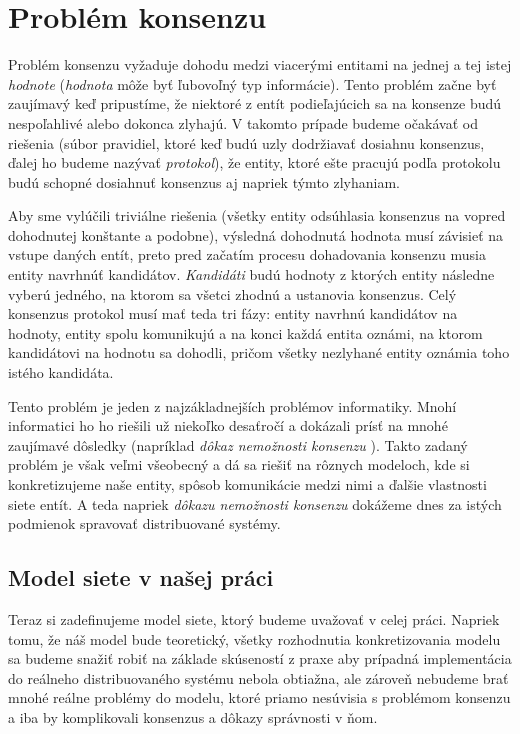 \chapter{Problém konsenzu}

Problém konsenzu vyžaduje dohodu medzi viacerými entitami na jednej a tej
istej \textit{hodnote} (\textit{hodnota} môže byť ľubovoľný typ informácie).
Tento problém začne byť zaujímavý keď pripustíme, že niektoré z entít
podieľajúcich sa na konsenze budú nespoľahlivé alebo dokonca zlyhajú. V takomto
prípade budeme očakávať od riešenia (súbor pravidiel, ktoré keď budú uzly dodržiavať
dosiahnu konsenzus, ďalej ho budeme nazývať \textit{protokol}),
že entity, ktoré ešte pracujú podľa protokolu budú schopné dosiahnuť konsenzus
aj napriek týmto zlyhaniam.

Aby sme vylúčili triviálne riešenia (všetky entity odsúhlasia konsenzus na vopred 
dohodnutej konštante a podobne), výsledná dohodnutá hodnota musí závisieť na vstupe
daných entít, preto pred začatím procesu dohadovania konsenzu
musia entity navrhnúť kandidátov. \textit{Kandidáti} budú hodnoty
z ktorých entity následne vyberú jedného, na ktorom sa všetci zhodnú a ustanovia
konsenzus.
Celý konsenzus protokol musí mať teda tri fázy: entity navrhnú kandidátov na hodnoty,
entity spolu komunikujú a na konci každá entita oznámi, na ktorom kandidátovi
na hodnotu sa dohodli, pričom všetky nezlyhané entity oznámia toho istého kandidáta.

Tento problém je jeden z najzákladnejších problémov informatiky.
Mnohí informatici ho ho riešili už niekoľko desaťročí a dokázali prísť
na mnohé zaujímavé dôsledky (napríklad \textit{dôkaz nemožnosti konsenzu}
\cite{fischer1982impossibility}). Takto zadaný problém je však veľmi všeobecný
a dá sa riešiť na rôznych modeloch, kde si konkretizujeme naše entity, spôsob
komunikácie medzi nimi a ďalšie vlastnosti siete entít. A teda napriek
\textit{dôkazu nemožnosti konsenzu} \cite{fischer1982impossibility} dokážeme dnes
za istých podmienok spravovať distribuované systémy.

\section {Model siete v našej práci}

Teraz si zadefinujeme model siete, ktorý budeme uvažovať v celej práci.
Napriek tomu, že náš model bude teoretický, všetky rozhodnutia konkretizovania
modelu sa budeme snažiť robiť na základe skúseností z praxe aby prípadná
implementácia do reálneho distribuovaného systému nebola obtiažna, ale zároveň
nebudeme brať mnohé reálne problémy do modelu, ktoré priamo nesúvisia s
problémom konsenzu a iba by komplikovali konsenzus a dôkazy správnosti v ňom.

